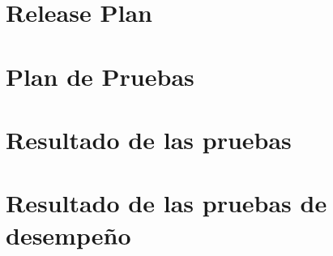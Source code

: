 \documentclass[onehalfspace]{USB}
\begin{document}






{}

\renewcommand\bibname{REFERENCIAS}


\appendix



\chapter{Release Plan}
% 


\chapter{Plan de Pruebas}


\chapter{Resultado de las pruebas}


\chapter{Resultado de las pruebas de desempeño}

\end{document}
